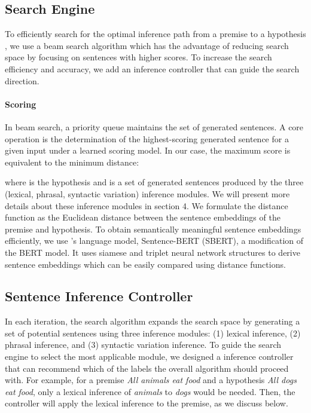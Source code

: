 \documentclass[11pt,a4paper]{article}
\begin{document}
\subsection{Search Engine}
To efficiently search for the optimal inference path from a premise  to a hypothesis , we use a beam search algorithm which has the advantage of reducing search space by focusing on sentences with higher scores. To increase the search efficiency and accuracy, we add an inference controller that can guide the search direction. 

\paragraph{Scoring}
In beam search, a priority queue  maintains the set of generated sentences. A core operation is the determination of the highest-scoring generated sentence for a given input under a learned scoring model. In our case, the maximum score is equivalent to the minimum distance:

where  is the hypothesis and  is a set of generated sentences produced by the three (lexical, phrasal, syntactic variation) inference modules. We will present more details about these inference modules in section 4. 
We formulate the distance function as the Euclidean distance between the sentence embeddings of the premise and hypothesis. To obtain semantically meaningful sentence embeddings efficiently, we use \citet{reimers-gurevych-2019-sentence}'s language model, Sentence-BERT (SBERT), a modification of the BERT model. It uses siamese and triplet neural network structures to derive sentence embeddings which can be easily compared using distance functions. 









\subsection{Sentence Inference Controller}
In each iteration, the search algorithm expands the search space by generating a set of potential sentences using three inference modules: (1) lexical inference, (2) phrasal inference, and (3) syntactic variation inference. To guide the search engine to select the most applicable module, we designed a inference controller that can recommend 
which of the labels the overall algorithm should proceed with. 
For example, for a premise
\textit{All animals eat food} and a hypothesis \textit{All dogs eat food}, only a lexical inference  of \textit{animals} to  \textit{dogs} would be needed. Then, the controller will apply the lexical inference  to the premise, as we discuss below.
\end{document}
